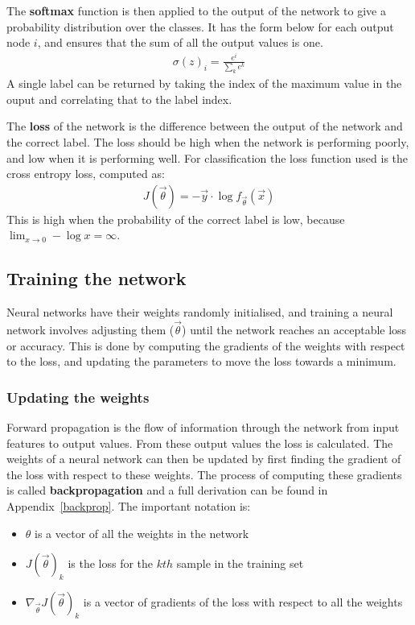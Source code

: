 The \textbf{softmax} function is then applied to the output of the network to give a probability distribution over the classes. It has the 
form below for each output node $i$, and ensures that the sum of all the output values is one.
\begin{align}
  \sigma(z)_{i} = \frac{e^{i}}{\sum_{k} e^{k}}
\end{align}
A single label can be returned by taking the index of the maximum value in the ouput and correlating that to the label index. 

The \textbf{loss} of the network is the difference between the output of the network and the correct label. The loss should be high 
when the network is performing poorly, and low when it is performing well. For classification the loss function used is the cross 
entropy loss, computed as:
\begin{align}
  J(\vec{\theta}) = - \vec{y} \cdot \log{f_{\vec{\theta}}(\vec{x})} \label{eq:ce}
\end{align}
This is high when the probability of the correct label is low, because $\lim_{x \to 0} -\log{x} = \infty$.

\subsection{Training the network} \label{train}

Neural networks have their weights randomly initialised, and training a neural network involves adjusting them 
($\vec{\theta}$) until the network reaches an acceptable loss or accuracy. This is done by computing 
the gradients of the weights with respect to the loss, and updating the parameters to move the loss towards 
a minimum.

\subsubsection{Updating the weights}

Forward propagation is the flow of information through the network from input features to output values. From these output values the loss is calculated. 
The weights of a neural network can then be updated by first finding the gradient of the loss with respect to these weights.
The process of computing these gradients is called \textbf{backpropagation} and a full derivation can be found in Appendix~\ref{backprop}. The important notation is:

\begin{itemize}
  \item $\theta$ is a vector of all the weights in the network
  \item $J(\vec{\theta})_k$ is the loss for the $kth$ sample in the training set
  \item $\nabla_{\vec{\theta}} J(\vec{\theta})_k$ is a vector of gradients of the loss with respect to all the weights 
\end{itemize}

